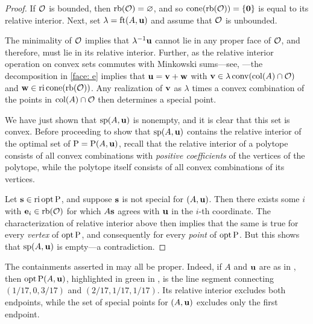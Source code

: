 \documentclass[11pt]{amsart}
\begin{document}
\begin{proof}
   If $\mathcal{O}$ is bounded, then $\operatorname{rb}(\mathcal{O}) = \varnothing$, and so $\operatorname{cone}( \operatorname{rb}(\mathcal{O})) = \{\mathbf{0} \}$ is equal to its relative interior.
   Next, set $\lambda = \operatorname{ft}(A, \mathbf{u})$ and assume that $\mathcal{O}$ is unbounded.

   The minimality of $\mathcal{O}$ implies that $\lambda^{-1}\mathbf{u}$ cannot lie in any proper face of $\mathcal{O}$, and therefore, must lie in its relative interior.  Further, as the relative interior operation on convex sets commutes with Minkowski sums---see, \eg \cite[Theorem 4.10(b)]{vantiel.convex_analysis}---the decomposition in \eqref{face: e}  implies that $\mathbf{u} = \mathbf{v} + \mathbf{w}$ with $\mathbf{v} \in \lambda \operatorname{conv}(\operatorname{col}(A) \cap \mathcal{O})$ and $\mathbf{w} \in \operatorname{ri} \operatorname{cone}(\operatorname{rb}(\mathcal{O}))$.  Any realization of $\mathbf{v}$ as $\lambda$ times a convex combination of the points in $\operatorname{col}(A) \cap \mathcal{O}$ then determines a special point.

 We have just shown that $\operatorname{sp}(A, \mathbf{u})$ is nonempty, and it is clear that this set is convex.
 Before proceeding to show that $\operatorname{sp}(A, \mathbf{u})$ contains the relative interior of the optimal set of $\mathrm{P} = \mathrm{P}(A,\mathbf{u})$,
  recall that the relative interior of a polytope consists of all convex combinations with \emph{positive coefficients} of the vertices of the polytope, while the polytope itself consists of all convex combinations of its vertices.

  Let $\mathbf{s} \in \operatorname{ri} \operatorname{opt} \mathrm{P}$, and suppose $\mathbf{s}$ is not special for $(A,\mathbf{u})$.
  Then there exists some $i$ with $\mathbf{e}_i \in \operatorname{rb}(\mathcal{O})$ for which $A\mathbf{s}$ agrees with $\mathbf{u}$ in the $i$-th coordinate.
  The characterization of relative interior above then implies that the same is true for every \emph{vertex} of $\operatorname{opt} \mathrm{P}$, and consequently for every \emph{point} of $\operatorname{opt} \mathrm{P}$.
  But this shows that $\operatorname{sp}(A,\mathbf{u})$ is empty---a contradiction.
\end{proof}

\begin{example}
   The containments asserted in  may all be proper.
   Indeed, if $A$ and $\mathbf{u}$ are as in , then $\operatorname{opt} \mathrm{P}(A,\mathbf{u})$, highlighted in green in , is the line segment connecting $(1/17, 0, 3/17)$ and $(2/17, 1/17, 1/17)$.
   Its relative interior excludes both endpoints, while the set of special points for $(A,\mathbf{u})$ excludes only the first endpoint.
\end{example}

\end{document}
